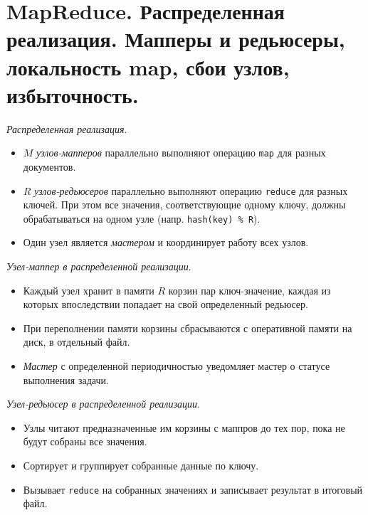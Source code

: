 \section{MapReduce. Распределенная реализация. Мапперы и редьюсеры, локальность
  map, сбои узлов, избыточность.}

\begin{algorithm}
  \textit{Распределенная реализация}.
  \begin{itemize}
    \item $M$ \textit{узлов-мапперов} параллельно выполняют операцию
      \texttt{map} для разных документов.
    \item $R$ \textit{узлов-редьюсеров} параллельно выполняют операцию
      \texttt{reduce} для разных ключей. При этом все значения,
      соответствующие одному ключу, должны обрабатываться на одном узле
      (напр. \texttt{hash(key) \% R}).
    \item Один узел является \textit{мастером} и координирует работу всех
      узлов.
  \end{itemize}
\end{algorithm}

\begin{definition}
  \textit{Узел-маппер в распределенной реализации}.
  \begin{itemize}
    \item Каждый узел хранит в памяти $R$ корзин пар ключ-значение, каждая из
      которых впоследствии попадает на свой определенный редьюсер.
    \item При переполнении памяти корзины сбрасываются с оперативной памяти на
      диск, в отдельный файл.
    \item \textit{Мастер} с определенной периодичностью уведомляет мастер о
      статусе выполнения задачи.
  \end{itemize}
\end{definition}

\begin{definition}
  \textit{Узел-редьюсер в распределенной реализации}.
  \begin{itemize}
    \item Узлы читают предназначенные им корзины с маппров до тех пор, пока не
      будут собраны все значения.
    \item Сортирует и группирует собранные данные по ключу.
    \item Вызывает \texttt{reduce} на собранных значениях и записывает результат
      в итоговый файл.
  \end{itemize}
\end{definition}

